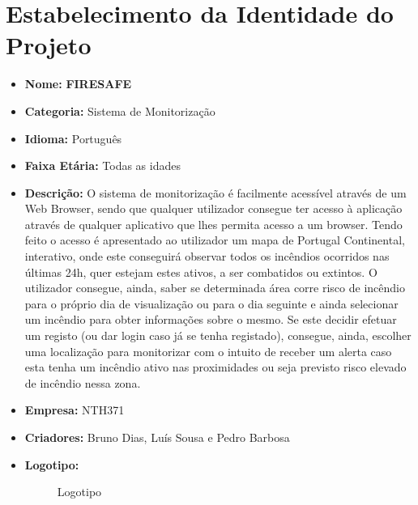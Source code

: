 \documentclass[a4paper,12pt]{scrreprt}
\begin{document}
    \section{Estabelecimento da Identidade do Projeto}
        \begin{itemize}
            \item {\large \textbf{Nome:}} \textbf{FIRESAFE}
            \item {\large \textbf{Categoria:}} Sistema de Monitorização
            \item {\large \textbf{Idioma:}} Português
            \item {\large \textbf{Faixa Etária:}} Todas as idades
            \item {\large \textbf{Descrição:}} O sistema de monitorização é facilmente acessível através de um Web Browser, sendo que qualquer utilizador consegue ter acesso à aplicação através de qualquer aplicativo que lhes permita acesso a um browser. Tendo feito o acesso é apresentado ao utilizador um mapa de Portugal Continental, interativo, onde este conseguirá observar todos os incêndios ocorridos nas últimas 24h, quer estejam estes ativos, a ser combatidos ou extintos. O utilizador consegue, ainda, saber se determinada área corre risco de incêndio para o próprio dia de visualização ou para o dia seguinte e ainda selecionar um incêndio para obter informações sobre o mesmo. Se este decidir efetuar um registo (ou dar login caso já se tenha registado), consegue, ainda, escolher uma localização para monitorizar com o intuito de receber um alerta caso esta tenha um incêndio ativo nas proximidades ou seja previsto risco elevado de incêndio nessa zona.
            \item {\large \textbf{Empresa:}} NTH371
            \item {\large \textbf{Criadores:}} Bruno Dias, Luís Sousa e Pedro Barbosa
            \item {\large \textbf{Logotipo:}} 
                \begin{figure}[hbt!]
                    \centering
                    \caption{Logotipo}
                \end{figure}
        \end{itemize}
        
\end{document}
